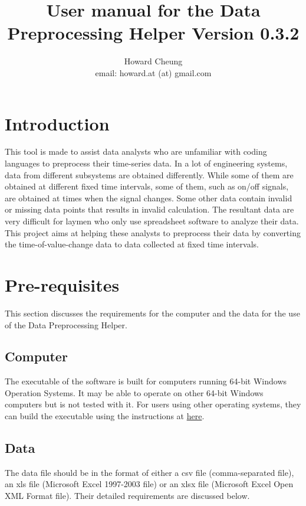 \documentclass[12pt,a4paper]{article}
\author{Howard Cheung \\ email: howard.at (at) gmail.com }
\title{User manual for the Data Preprocessing Helper Version 0.3.2}
\begin{document}
\maketitle

\tableofcontents

\section{Introduction}

This tool is made to assist data analysts who are unfamiliar with coding languages to preprocess their time-series data.
In a lot of engineering systems, data from different subsystems are obtained differently.
While some of them are obtained at different fixed time intervals, some of them, such as on/off signals, are obtained at times when the signal changes.
Some other data contain invalid or missing data points that results in invalid calculation.
The resultant data are very difficult for laymen who only use spreadsheet software to analyze their data.
This project aims at helping these analysts to preprocess their data by converting the time-of-value-change data to data collected at fixed time intervals.

\section{Pre-requisites}
This section discusses the requirements for the computer and the data for the use of the Data Preprocessing Helper.

\subsection{Computer}
The executable of the software is built for computers running 64-bit Windows Operation Systems.
It may be able to operate on other 64-bit Windows computers but is not tested with it.
For users using other operating systems, they can build the executable using the instructions at \href{https://github.com/howardcheung/data-preprocessing-helper/blob/master/exe/README.md}{here}.

\subsection{Data}
The data file should be in the format of either a csv file (comma-separated file), an xls file (Microsoft Excel 1997-2003 file) or an xlsx file (Microsoft Excel Open XML Format file). Their detailed requirements are discussed below.
\end{document}
